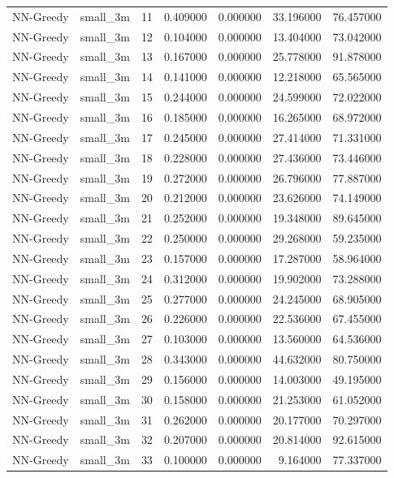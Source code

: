 \begin{tabular}{llrrrrr}
NN-Greedy & small_3m & 11 & 0.409000 & 0.000000 & 33.196000 & 76.457000 \\
NN-Greedy & small_3m & 12 & 0.104000 & 0.000000 & 13.404000 & 73.042000 \\
NN-Greedy & small_3m & 13 & 0.167000 & 0.000000 & 25.778000 & 91.878000 \\
NN-Greedy & small_3m & 14 & 0.141000 & 0.000000 & 12.218000 & 65.565000 \\
NN-Greedy & small_3m & 15 & 0.244000 & 0.000000 & 24.599000 & 72.022000 \\
NN-Greedy & small_3m & 16 & 0.185000 & 0.000000 & 16.265000 & 68.972000 \\
NN-Greedy & small_3m & 17 & 0.245000 & 0.000000 & 27.414000 & 71.331000 \\
NN-Greedy & small_3m & 18 & 0.228000 & 0.000000 & 27.436000 & 73.446000 \\
NN-Greedy & small_3m & 19 & 0.272000 & 0.000000 & 26.796000 & 77.887000 \\
NN-Greedy & small_3m & 20 & 0.212000 & 0.000000 & 23.626000 & 74.149000 \\
NN-Greedy & small_3m & 21 & 0.252000 & 0.000000 & 19.348000 & 89.645000 \\
NN-Greedy & small_3m & 22 & 0.250000 & 0.000000 & 29.268000 & 59.235000 \\
NN-Greedy & small_3m & 23 & 0.157000 & 0.000000 & 17.287000 & 58.964000 \\
NN-Greedy & small_3m & 24 & 0.312000 & 0.000000 & 19.902000 & 73.288000 \\
NN-Greedy & small_3m & 25 & 0.277000 & 0.000000 & 24.245000 & 68.905000 \\
NN-Greedy & small_3m & 26 & 0.226000 & 0.000000 & 22.536000 & 67.455000 \\
NN-Greedy & small_3m & 27 & 0.103000 & 0.000000 & 13.560000 & 64.536000 \\
NN-Greedy & small_3m & 28 & 0.343000 & 0.000000 & 44.632000 & 80.750000 \\
NN-Greedy & small_3m & 29 & 0.156000 & 0.000000 & 14.003000 & 49.195000 \\
NN-Greedy & small_3m & 30 & 0.158000 & 0.000000 & 21.253000 & 61.052000 \\
NN-Greedy & small_3m & 31 & 0.262000 & 0.000000 & 20.177000 & 70.297000 \\
NN-Greedy & small_3m & 32 & 0.207000 & 0.000000 & 20.814000 & 92.615000 \\
NN-Greedy & small_3m & 33 & 0.100000 & 0.000000 & 9.164000 & 77.337000 \\

\end{tabular}
